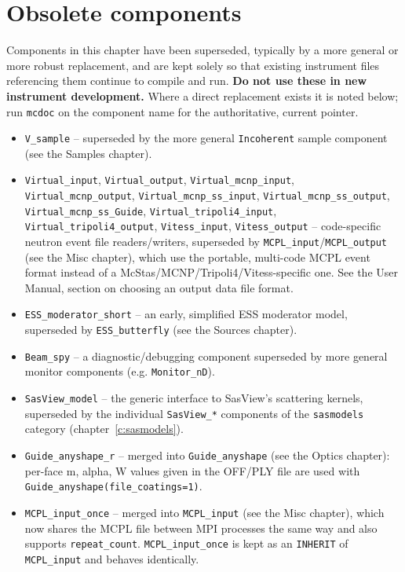 
\chapter{Obsolete components}
\label{c:obsolete}

Components in this chapter have been superseded, typically by a more
general or more robust replacement, and are kept solely so that existing
instrument files referencing them continue to compile and run. \textbf{Do
not use these in new instrument development.} Where a direct replacement
exists it is noted below; run \verb+mcdoc+ on the component name for the
authoritative, current pointer.

\begin{itemize}
\item \texttt{V\_sample} -- superseded by the more general
  \texttt{Incoherent} sample component (see the Samples chapter).
\item \texttt{Virtual\_input}, \texttt{Virtual\_output},
  \texttt{Virtual\_mcnp\_input}, \texttt{Virtual\_mcnp\_output},
  \texttt{Virtual\_mcnp\_ss\_input}, \texttt{Virtual\_mcnp\_ss\_output},
  \texttt{Virtual\_mcnp\_ss\_Guide}, \texttt{Virtual\_tripoli4\_input},
  \texttt{Virtual\_tripoli4\_output}, \texttt{Vitess\_input},
  \texttt{Vitess\_output} -- code-specific neutron event file readers/writers,
  superseded by \texttt{MCPL\_input}/\texttt{MCPL\_output} (see the Misc
  chapter), which use the portable, multi-code MCPL event format instead of
  a McStas/MCNP/Tripoli4/Vitess-specific one. See the User Manual, section
  on choosing an output data file format.
\item \texttt{ESS\_moderator\_short} -- an early, simplified ESS moderator
  model, superseded by \texttt{ESS\_butterfly} (see the Sources chapter).
\item \texttt{Beam\_spy} -- a diagnostic/debugging component superseded by
  more general monitor components (e.g. \texttt{Monitor\_nD}).
\item \texttt{SasView\_model} -- the generic interface to SasView's
  scattering kernels, superseded by the individual \texttt{SasView\_*}
  components of the \texttt{sasmodels} category (chapter~\ref{c:sasmodels}).
\item \texttt{Guide\_anyshape\_r} -- merged into \texttt{Guide\_anyshape}
  (see the Optics chapter): per-face m, alpha, W values given in the OFF/PLY
  file are used with \texttt{Guide\_anyshape(file\_coatings=1)}.
\item \texttt{MCPL\_input\_once} -- merged into \texttt{MCPL\_input}
  (see the Misc chapter), which now shares the MCPL file between MPI
  processes the same way and also supports \texttt{repeat\_count}.
  \texttt{MCPL\_input\_once} is kept as an \texttt{INHERIT} of
  \texttt{MCPL\_input} and behaves identically.
\end{itemize}

